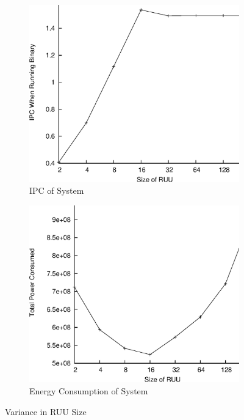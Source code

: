\documentclass[paper=a4, fontsize=11pt]{scrartcl} %
\numberwithin{equation}{section} %
\numberwithin{figure}{section} %
\numberwithin{table}{section} %
\begin{document}
\begin{figure}
\centering
\begin{subfigure}{0.5\textwidth}
  \centering
   \includegraphics[width=\linewidth]{graphs/ruuipc.eps}
  \caption{IPC of System}
\end{subfigure}%
\begin{subfigure}{0.5\textwidth}
  \centering
   \includegraphics[width=\linewidth]{graphs/ruuenergy.eps}
  \caption{Energy Consumption of System}
\end{subfigure}
\caption{Variance in RUU Size}
\end{figure}
\end{document}

